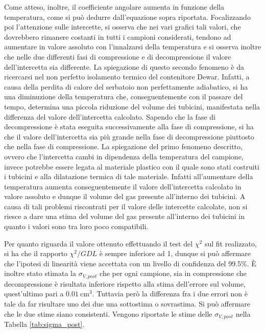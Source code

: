 \documentclass[a4paper,11pt,oneside]{article}
\begin{document}
Come atteso, inoltre, il coefficiente angolare aumenta in funzione della temperatura, come si può dedurre dall'equazione sopra riportata.
Focalizzando poi l'attenzione sulle intercette, si osserva che nei vari grafici tali valori, che dovrebbero rimanere costanti in tutti i campioni considerati, tendono ad aumentare in valore assoluto con l'innalzarsi della temperatura e si osserva inoltre che nelle due differenti fasi di compressione e di decompressione il valore dell'intercetta sia differente. La spiegazione di questo secondo fenomeno è da ricercarsi nel non perfetto isolamento termico del contenitore Dewar. Infatti, a causa della perdita di calore del serbatoio non perfettamente adiabatico, si ha una diminuzione della temperatura che, conseguentemente con il passare del tempo, determina una piccola riduzione del volume dei tubicini, manifestata nella differenza del valore dell'intercetta calcolato. Sapendo che la fase di decompressione è stata eseguita successivamente alla fase di compressione, si ha che il valore dell'intercetta sia più grande nella fase di decompressione piuttosto che nella fase di compressione. La spiegazione del primo fenomeno descritto, ovvero che l'intercetta cambi in dipendenza della temperatura del campione, invece potrebbe essere legata al materiale plastico con il quale sono stati costruiti i tubicini e alla dilatazione termica di tale materiale. Infatti all'aumentare della temperatura aumenta conseguentemente il valore dell'intercetta calcolato in valore assoluto e dunque il volume del gas presente all'interno dei tubicini. A causa di tali problemi riscontrati per il valore delle intercette calcolate, non si riesce a dare una stima del volume del gas presente all'interno dei tubicini in quanto i valori sono tra loro poco compatibili.

Per quanto riguarda il valore ottenuto effettuando il test del $\chi^2$ sul fit realizzato, si ha che il rapporto $\chi^2/GDL$ è sempre inferiore ad 1, dunque si può affermare che l'ipotesi di linearità viene accettata con un livello di confidenza del 99.5\%.
È inoltre stato stimata la $\sigma_{V, post}$ che per ogni campione, sia in compressione che decompressione è risultata inferiore rispetto alla stima dell'errore sul volume, quest'ultimo pari a $\SI{0.01}{\centi\meter\cubed}$. Tuttavia però la differenza fra i due errori non è tale da far risultare uno dei due una sottostima o sovrastima. Si può affermare che le due stime siano consistenti. Vengono riportate le stime delle $\sigma_{V, post}$ nella Tabella \ref{tab:sigma_post}.
\end{document}
